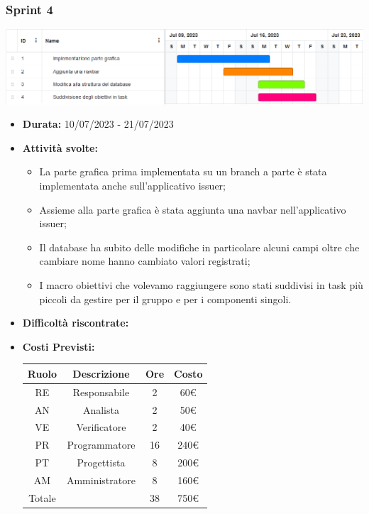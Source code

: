 \subsubsection{Sprint 4}
\begin{center}
    \includegraphics[scale = 0.5]{./res/img/Sprint_4.png}
  \end{center}
\begin{itemize}
    \item \textbf{Durata:} 10/07/2023 - 21/07/2023 
    \item \textbf{Attività svolte:}
    \begin{itemize}
        \item La parte grafica prima implementata su un branch a parte è stata implementata anche sull'applicativo issuer;
        \item Assieme alla parte grafica è stata aggiunta una navbar nell'applicativo issuer; 
        \item Il database ha subito delle modifiche in particolare alcuni campi oltre che cambiare nome hanno cambiato valori registrati;
        \item I macro obiettivi che volevamo raggiungere sono stati suddivisi in task più piccoli da gestire per il gruppo e per i componenti singoli.
    \end{itemize}
    \item \textbf{Difficoltà riscontrate:}
    \item \textbf{Costi Previsti:}
    \begin{longtable}{|c|c|c|c|}
        \hline
        Ruolo & Descrizione & Ore & Costo \\
        \hline
        RE & Responsabile & 2 & 60€ \\
        \hline
        AN & Analista & 2 & 50€ \\
        \hline
        VE & Verificatore & 2 & 40€ \\
        \hline
        PR & Programmatore & 16 & 240€ \\
        \hline
        PT & Progettista & 8 & 200€ \\
        \hline
        AM & Amministratore & 8 & 160€ \\
        \hline
        Totale & & 38 & 750€ \\

\end{longtable}
\end{itemize}
